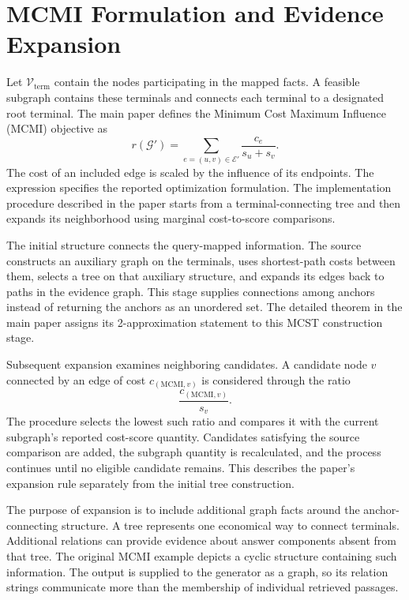 \section{MCMI Formulation and Evidence Expansion}
\label{sec:agrag:mcmi}
Let $\mathcal{V}_{\mathrm{term}}$ contain the nodes participating in the mapped facts. A feasible subgraph contains these terminals and connects each terminal to a designated root terminal. The main paper defines the Minimum Cost Maximum Influence (MCMI) objective as
\begin{equation}
r(\mathcal{G}')=\sum_{e=(u,v)\in\mathcal{E}'}
\frac{c_e}{s_u+s_v}.
\label{eq:agrag:mcmi-objective}
\end{equation}
The cost of an included edge is scaled by the influence of its endpoints. The expression specifies the reported optimization formulation. The implementation procedure described in the paper starts from a terminal-connecting tree and then expands its neighborhood using marginal cost-to-score comparisons.

The initial structure connects the query-mapped information. The source constructs an auxiliary graph on the terminals, uses shortest-path costs between them, selects a tree on that auxiliary structure, and expands its edges back to paths in the evidence graph. This stage supplies connections among anchors instead of returning the anchors as an unordered set. The detailed theorem in the main paper assigns its 2-approximation statement to this MCST construction stage.

Subsequent expansion examines neighboring candidates. A candidate node $v$ connected by an edge of cost $c_{(\mathrm{MCMI},v)}$ is considered through the ratio
\begin{equation}
\frac{c_{(\mathrm{MCMI},v)}}{s_v}.
\label{eq:agrag:marginal}
\end{equation}
The procedure selects the lowest such ratio and compares it with the current subgraph's reported cost-score quantity. Candidates satisfying the source comparison are added, the subgraph quantity is recalculated, and the process continues until no eligible candidate remains. This describes the paper's expansion rule separately from the initial tree construction.

The purpose of expansion is to include additional graph facts around the anchor-connecting structure. A tree represents one economical way to connect terminals. Additional relations can provide evidence about answer components absent from that tree. The original MCMI example depicts a cyclic structure containing such information. The output is supplied to the generator as a graph, so its relation strings communicate more than the membership of individual retrieved passages.

